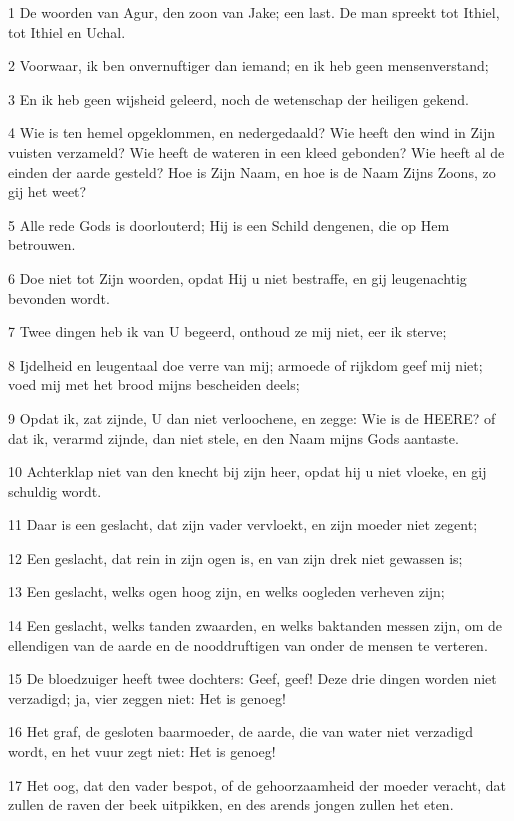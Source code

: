 \par 1 De woorden van Agur, den zoon van Jake; een last. De man spreekt tot Ithiel, tot Ithiel en Uchal.
\par 2 Voorwaar, ik ben onvernuftiger dan iemand; en ik heb geen mensenverstand;
\par 3 En ik heb geen wijsheid geleerd, noch de wetenschap der heiligen gekend.
\par 4 Wie is ten hemel opgeklommen, en nedergedaald? Wie heeft den wind in Zijn vuisten verzameld? Wie heeft de wateren in een kleed gebonden? Wie heeft al de einden der aarde gesteld? Hoe is Zijn Naam, en hoe is de Naam Zijns Zoons, zo gij het weet?
\par 5 Alle rede Gods is doorlouterd; Hij is een Schild dengenen, die op Hem betrouwen.
\par 6 Doe niet tot Zijn woorden, opdat Hij u niet bestraffe, en gij leugenachtig bevonden wordt.
\par 7 Twee dingen heb ik van U begeerd, onthoud ze mij niet, eer ik sterve;
\par 8 Ijdelheid en leugentaal doe verre van mij; armoede of rijkdom geef mij niet; voed mij met het brood mijns bescheiden deels;
\par 9 Opdat ik, zat zijnde, U dan niet verloochene, en zegge: Wie is de HEERE? of dat ik, verarmd zijnde, dan niet stele, en den Naam mijns Gods aantaste.
\par 10 Achterklap niet van den knecht bij zijn heer, opdat hij u niet vloeke, en gij schuldig wordt.
\par 11 Daar is een geslacht, dat zijn vader vervloekt, en zijn moeder niet zegent;
\par 12 Een geslacht, dat rein in zijn ogen is, en van zijn drek niet gewassen is;
\par 13 Een geslacht, welks ogen hoog zijn, en welks oogleden verheven zijn;
\par 14 Een geslacht, welks tanden zwaarden, en welks baktanden messen zijn, om de ellendigen van de aarde en de nooddruftigen van onder de mensen te verteren.
\par 15 De bloedzuiger heeft twee dochters: Geef, geef! Deze drie dingen worden niet verzadigd; ja, vier zeggen niet: Het is genoeg!
\par 16 Het graf, de gesloten baarmoeder, de aarde, die van water niet verzadigd wordt, en het vuur zegt niet: Het is genoeg!
\par 17 Het oog, dat den vader bespot, of de gehoorzaamheid der moeder veracht, dat zullen de raven der beek uitpikken, en des arends jongen zullen het eten.
